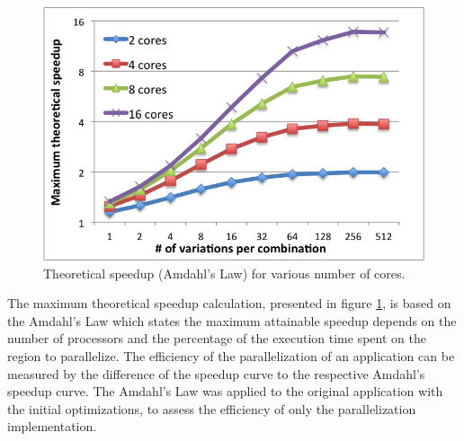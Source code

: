 \begin{figure}[!htp]
	\begin{center}
		\includegraphics[scale=0.7]{../../common/graphs/amdahl_speedup.png}
		\caption{Theoretical speedup (Amdahl's Law) for various number of cores.}
		\label{fig:AmdahlSpeedup}
	\end{center}
\end{figure}

The maximum theoretical speedup calculation, presented in figure \ref{fig:AmdahlSpeedup}, is based on the Amdahl's Law \cite{AMDAHL} which states the maximum attainable speedup depends on the number of processors and the percentage of the execution time spent on the region to parallelize. The efficiency of the parallelization of an application can be measured by the difference of the speedup curve to the respective Amdahl's speedup curve. The Amdahl's Law was applied to the original application with the initial optimizations, to assess the efficiency of only the parallelization implementation.

